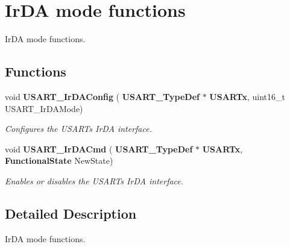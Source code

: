\section{Ir\+DA mode functions}
\label{group__USART__Group7}


Ir\+DA mode functions.  


\subsection*{Functions}
\begin{DoxyCompactItemize}
\item 
void \textbf{ U\+S\+A\+R\+T\+\_\+\+Ir\+D\+A\+Config} (\textbf{ U\+S\+A\+R\+T\+\_\+\+Type\+Def} $\ast$\textbf{ U\+S\+A\+R\+Tx}, uint16\+\_\+t U\+S\+A\+R\+T\+\_\+\+Ir\+D\+A\+Mode)
\begin{DoxyCompactList}\small\item\em Configures the U\+S\+A\+RT\textquotesingle{}s Ir\+DA interface. \end{DoxyCompactList}\item 
void \textbf{ U\+S\+A\+R\+T\+\_\+\+Ir\+D\+A\+Cmd} (\textbf{ U\+S\+A\+R\+T\+\_\+\+Type\+Def} $\ast$\textbf{ U\+S\+A\+R\+Tx}, \textbf{ Functional\+State} New\+State)
\begin{DoxyCompactList}\small\item\em Enables or disables the U\+S\+A\+RT\textquotesingle{}s Ir\+DA interface. \end{DoxyCompactList}\end{DoxyCompactItemize}


\subsection{Detailed Description}
Ir\+DA mode functions. 

